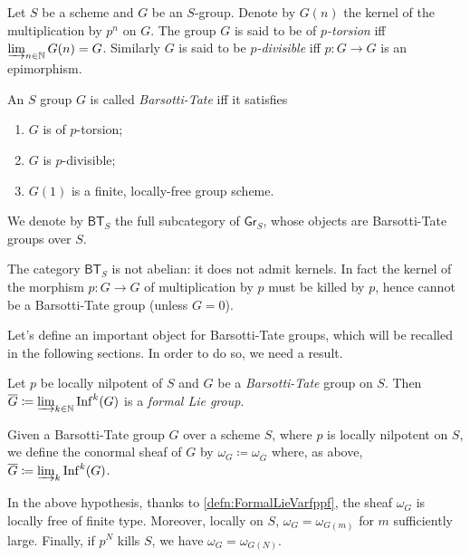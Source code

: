 \documentclass[../Main]{subfiles}
\begin{document}
\begin{defn}
	Let $S$ be a scheme and $G$ be an $S$-group.
	Denote by $G(n)$ the kernel of the multiplication by $p^n$ on $G$.
	The group $G$ is said to be of {\em $p$-torsion} iff $\varinjlim_{n \in \mathbb{N}} G(n) = G$.
	Similarly $G$ is said to be {\em $p$-divisible} iff $p\colon G \to G$
	is an epimorphism.
\end{defn}


\begin{defn}\label{BTGroup}
	An $S$ group $G$ is called {\em Barsotti-Tate} iff it satisfies
\begin{enumerate}
	\item $G$ is of $p$-torsion;
	\item $G$ is $p$-divisible;
	\item $G(1)$ is a finite, locally-free group scheme.
\end{enumerate}
	We denote by $\mathsf{BT}_S$ the full subcategory of $\mathsf{Gr}_S$,
	whose objects are Barsotti-Tate groups over $S$.
\end{defn}


\begin{rem}[]
	The category $\mathsf{BT}_S$ is not abelian:
	it does not admit kernels.
	In fact the kernel of the morphism $p\colon G \to G$
	of multiplication by $p$ must be killed by $p$, hence cannot be
	a Barsotti-Tate group (unless $G=0$).
\end{rem}


\noindent
Let's define an important object for Barsotti-Tate groups,
which will be recalled in the following sections.
In order to do so, we need a result.


\begin{lem}
	Let $p$ be locally nilpotent of $S$ and $G$ be a {\em Barsotti-Tate} group on $S$.
	Then
	$\overline{G} \coloneqq \varinjlim_{k \in \mathbb{N}} \mathrm{Inf}^k(G)$
	is a {\em formal Lie group}.
\end{lem}


\begin{defn}
	Given a Barsotti-Tate group $G$ over a scheme $S$, where $p$ is locally nilpotent on $S$,
	we define the conormal sheaf of $G$ by $\omega_G \coloneqq \omega_{\overline{G}}$
	where, as above, $\overline{G} \coloneqq \varinjlim_k \mathrm{Inf}^k(G)$.
\end{defn}


\begin{rem}
	In the above hypothesis,
	thanks to \cref{defn:FormalLieVarfppf}, 
	the sheaf $\omega_G$ is
	locally free of finite type.
	Moreover, locally on $S$, $\omega_G = \omega_{G(m)}$ for
	$m$ sufficiently large.
	Finally, if $p^N$ kills $S$, we have $\omega_G = \omega_{G(N)}$.
\end{rem}
\end{document}
